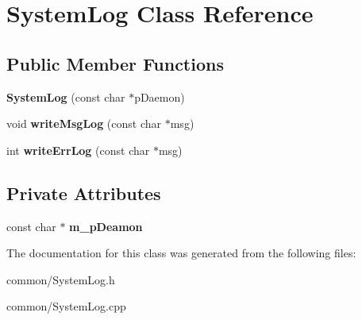 \hypertarget{classSystemLog}{\section{System\-Log Class Reference}
\label{classSystemLog}
}
\subsection*{Public Member Functions}
\begin{DoxyCompactItemize}
\item 
\hypertarget{classSystemLog_a95cdee97db2f439dc68408f7428a032e}{{\bfseries System\-Log} (const char $\ast$p\-Daemon)}\label{classSystemLog_a95cdee97db2f439dc68408f7428a032e}

\item 
\hypertarget{classSystemLog_a8aad2362d938a8973dc2d06bb1465415}{void {\bfseries write\-Msg\-Log} (const char $\ast$msg)}\label{classSystemLog_a8aad2362d938a8973dc2d06bb1465415}

\item 
\hypertarget{classSystemLog_a394f7593601ae73851cff8e7fc6cd299}{int {\bfseries write\-Err\-Log} (const char $\ast$msg)}\label{classSystemLog_a394f7593601ae73851cff8e7fc6cd299}

\end{DoxyCompactItemize}
\subsection*{Private Attributes}
\begin{DoxyCompactItemize}
\item 
\hypertarget{classSystemLog_a169a179640dec0f42020352a8a56f798}{const char $\ast$ {\bfseries m\-\_\-p\-Deamon}}\label{classSystemLog_a169a179640dec0f42020352a8a56f798}

\end{DoxyCompactItemize}


The documentation for this class was generated from the following files\-:\begin{DoxyCompactItemize}
\item 
common/System\-Log.\-h\item 
common/System\-Log.\-cpp\end{DoxyCompactItemize}

